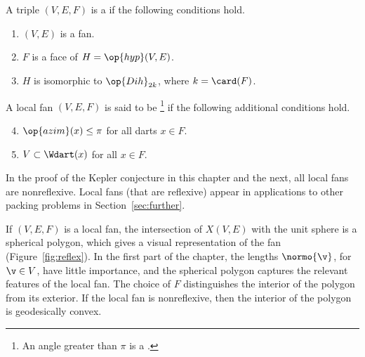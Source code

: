 \begin{definition} \label{def:convex-local}
A triple $(V,E,F)$ is a  if the following conditions hold.
\begin{enumerate} 
\item {} $(V,E)$ is a fan.
\item {} $F$ is a face of $H = \op{hyp}(V,E)$.
\item {} $H$ is isomorphic to $\op{Dih}_{2k}$, where $k =
\card(F)$.
\end{enumerate}
A local fan $(V,E,F)$ is said to be \footnote{An angle
greater than $\pi$ is a .} if the following
additional conditions hold.
\begin{enumerate}
\setcounter{enumi}{3}
\item %
 $\op{azim}(x)\le \pi$ for all darts $x\in F$.
\item {} $V\subset \Wdart(x)$ for all $x\in F$.
\end{enumerate}
\end{definition}
%

In the proof of the Kepler conjecture in this chapter and the next,
all local fans are nonreflexive.  Local fans (that are reflexive) appear in
applications to other packing problems in Section~\ref{sec:further}.

\begin{remark}[visualization]\label{rem:visual}
\hspace{-3pt}
  If $(V,E,F)$ is a local fan,
  the intersection of $X(V,E)$ with the unit sphere is a spherical
  polygon, which gives a visual representation of the fan (Figure~\ref{fig:reflex}).
  In the first part of the chapter, the lengths $\normo{\v}$, for $\v\in V$,
  have little importance, and the spherical polygon captures the relevant
  features of the local fan.
  The choice of $F$ distinguishes the interior of the polygon from its
  exterior.  If the local fan is nonreflexive, then the interior of the
  polygon is geodesically convex.
\end{remark}

\figFWYNFVS %


